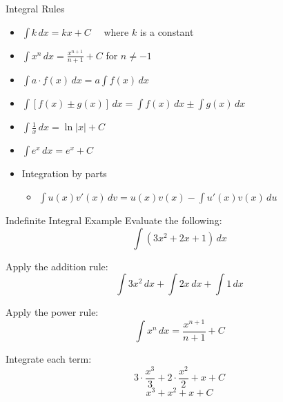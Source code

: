 \documentclass[aspectratio=169]{beamer}
\begin{document}
\begin{frame}{Integral Rules}\label{main1}
\begin{itemize}
	\begin{itemize}
		\item $\int k \, dx = kx + C \quad $ where $k$ is a constant
		\item $\int x^n \, dx = \frac{x^{n+1}}{n+1} + C$ for $n \ne -1$
		\item $ \int a \cdot f(x)\, dx = a \int f(x)\, dx $
		\item $ \int [f(x) \pm g(x)]\, dx = \int f(x)\, dx \pm \int g(x)\, dx $
		\item $ \int \frac{1}{x} \, dx = \ln|x| + C $
		\item $ \int e^x \, dx = e^x + C $
		\item Integration by parts
		\begin{itemize}
			\item $ \int u(x) v'(x) \, dv = u(x) v(x) - \int u'(x) v(x) \, du $
		\end{itemize}
	\end{itemize}
\end{itemize}
\end{frame}

\begin{frame}{Indefinite Integral Example}
Evaluate the following:
\[
\int (3x^2 + 2x + 1) \, dx
\]

Apply the addition rule:
\[
\int 3x^2 \, dx + \int 2x \, dx + \int 1 \, dx
\]

Apply the power rule:
\[
\int x^n \, dx = \frac{x^{n+1}}{n+1} + C
\]

Integrate each term:
\[
3 \cdot \frac{x^3}{3} + 2 \cdot \frac{x^2}{2} + x + C
\]
\[
x^3 + x^2 + x + C
\]
\end{frame}
\end{document}
